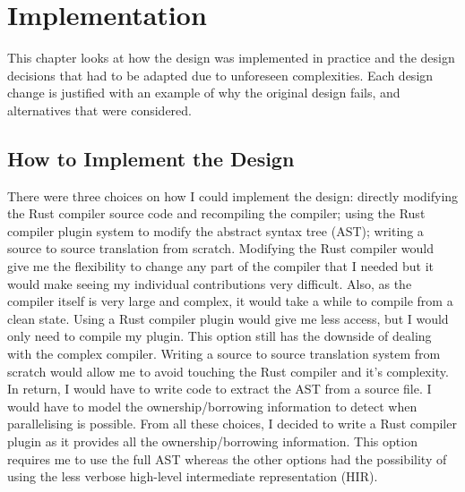 \chapter{Implementation}
\label{chapter:Implementation}

This chapter looks at how the design was implemented in practice and the design decisions that had to be adapted due to unforeseen complexities. Each design change is justified with an example of why the original design fails, and alternatives that were considered.

\section{How to Implement the Design}
There were three choices on how I could implement the design: directly modifying the Rust compiler source code and recompiling the compiler; using the Rust compiler plugin system to modify the abstract syntax tree (AST); writing a source to source translation from scratch. Modifying the Rust compiler would give me the flexibility to change any part of the compiler that I needed but it would make seeing my individual contributions very difficult. Also, as the compiler itself is very large and complex, it would take a while to compile from a clean state. Using a Rust compiler plugin would give me less access, but I would only need to compile my plugin. This option still has the downside of dealing with the complex compiler. Writing a source to source translation system from scratch would allow me to avoid touching the Rust compiler and it's complexity. In return, I would have to write code to extract the AST from a source file. I would have to model the ownership/borrowing information to detect when parallelising is possible. From all these choices, I decided to write a Rust compiler plugin as it provides all the ownership/borrowing information. This option requires me to use the full AST whereas the other options had the possibility of using the less verbose high-level intermediate representation (HIR).

